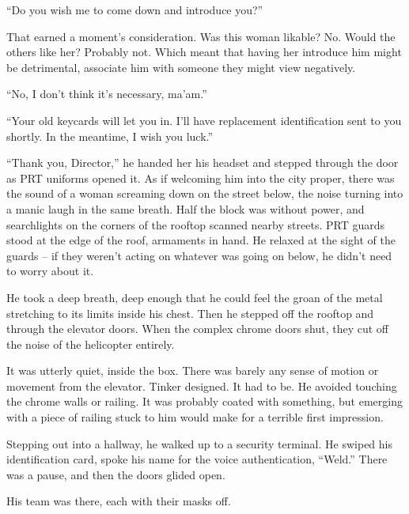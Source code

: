 ``Do you wish me to come down and introduce you?''



That earned a moment's consideration.  Was this woman likable?  No.  Would the others like her?  Probably not.  Which meant that having her introduce him might be detrimental, associate him with someone they might view negatively.



``No, I don't think it's necessary, ma'am.''



``Your old keycards will let you in.  I'll have replacement identification sent to you shortly.  In the meantime, I wish you luck.''



``Thank you, Director,'' he handed her his headset and stepped through the door as PRT uniforms opened it.  As if welcoming him into the city proper, there was the sound of a woman screaming down on the street below, the noise turning into a manic laugh in the same breath.  Half the block was without power, and searchlights on the corners of the rooftop scanned nearby streets.  PRT guards stood at the edge of the roof, armaments in hand.  He relaxed at the sight of the guards – if they weren't acting on whatever was going on below, he didn't need to worry about it.



He took a deep breath, deep enough that he could feel the groan of the metal stretching to its limits inside his chest.  Then he stepped off the rooftop and through the elevator doors.  When the complex chrome doors shut, they cut off the noise of the helicopter entirely.



It was utterly quiet, inside the box.  There was barely any sense of motion or movement from the elevator.  Tinker designed.  It had to be.  He avoided touching the chrome walls or railing.  It was probably coated with something, but emerging with a piece of railing stuck to him would make for a terrible first impression.



Stepping out into a hallway, he walked up to a security terminal.  He swiped his identification card, spoke his name for the voice authentication, ``Weld.''  There was a pause, and then the doors glided open.



His team was there, each with their masks off.



